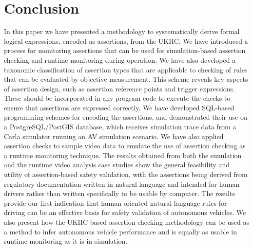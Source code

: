 \section{Conclusion}\label{conclusion}

In this paper we have presented a methodology to systematically derive formal logical expressions, encoded as assertions, from the UKHC. We have introduced a process for monitoring assertions that can be used for simulation-based assertion checking and runtime monitoring during operation.
We have also developed a taxonomic classification of assertion types that are applicable to checking of rules that can be evaluated by objective measurement. This scheme reveals key aspects of assertion design, such as assertion reference points and trigger expressions. These should be incorporated in any program code to execute the checks to ensure that assertions are expressed correctly. We have developed SQL-based programming schemes for encoding the assertions, and demonstrated their use on a PostgreSQL/PostGIS database, which receives simulation trace data from a Carla simulator running an AV simulation scenario. We have also applied assertion checks to sample video data to emulate the use of assertion checking as a runtime monitoring technique.
The results obtained from both the simulation and the runtime video analysis case studies show the general feasibility and utility of assertion-based safety validation, with the assertions being derived from regulatory documentation written in natural language and intended for human drivers rather than written specifically to be usable by computer. The results provide our first indication that human-oriented natural language rules for driving can be an effective %
basis
for %
safety validation of autonomous vehicles.
We also present how the UKHC-based assertion checking methodology can be used as a method to infer autonomous vehicle performance and 
is equally as usable in runtime monitoring as it is in simulation.

